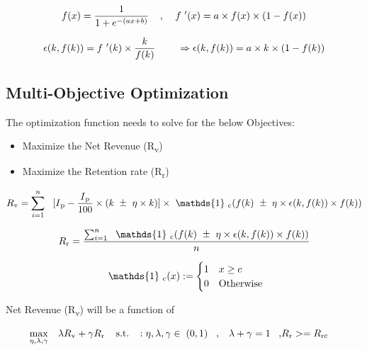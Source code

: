  \begin{equation}
    f(x) = \frac{1}{1 + e^{-(ax+b)}} \;\;\;\; ,\;\;\;\;
    f\textsuperscript{'}(x) = a\times f(x)\times (1 - f(x))
    \label{eq:fx}
  \end{equation}


 \begin{equation}
    \epsilon(k,f(k)) = f\textsuperscript{'}(k) \times\frac{k}{f(k)} \;\;\;\; \;\;\;\;
    \Rightarrow \epsilon(k,f(k)) = a\times k\times (1 - f(k))
    \label{eq:fx}
  \end{equation}

\subsection{Multi-Objective Optimization}
The optimization function needs to solve for the below Objectives:
\begin{itemize}
\item Maximize the Net Revenue (R\textsubscript{v})
\item Maximize the Retention rate (R\textsubscript{r})
\end{itemize}

 \begin{equation}
    R\textsubscript{v} = \sum_{i=1}^{n}\;\;\;[I\textsubscript{p} - \frac{I\textsubscript{p}}{100} \times (k \mypm \eta\times k)]
    \times
    \ \mathds{1} \ \textsubscript{c}(f(k) \mypm \eta\times \epsilon(k,f(k))\times f(k))
    \label{eq:fx}
  \end{equation}

\begin{equation}
    R\textsubscript{r} = \frac{\sum_{i=1}^{n}\; \ \mathds{1} \ \textsubscript{c}(f(k) \mypm \eta\times 
    \epsilon(k,f(k))\times f(k))}{n}
    \label{eq:fx}
  \end{equation}

  \begin{equation}
    \ \mathds{1} \ \textsubscript{c}(x) :=
        \begin{cases}
          1 & x \geq c\\
          0 & \text{Otherwise}
        \end{cases}
    \label{eq:fx}
  \end{equation}

Net Revenue (R\textsubscript{v}) will be a function of 

\begin{equation}
\begin{aligned}
\max_{\eta, \lambda, \gamma} \quad & 
\lambda R\textsubscript{v} + \gamma R\textsubscript{r}\;\;\;\;
\textrm{s.t.}  \;\;\;:
\eta, \lambda, \gamma \in \; (0,1) \;\;\;,
&\lambda + \gamma = 1 \;\;\;,
&R\textsubscript{r} >= R\textsubscript{rc} 
\end{aligned}
\end{equation}
